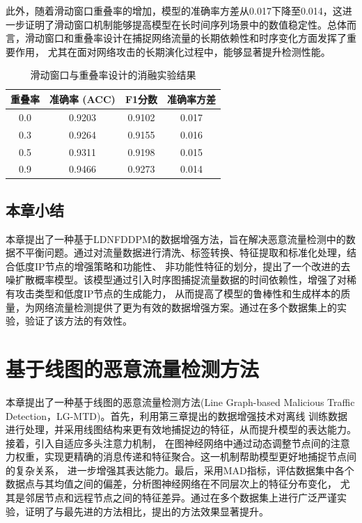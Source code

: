 \documentclass[promaster]{thesis-uestc}
\begin{document}
此外，随着滑动窗口重叠率的增加，模型的准确率方差从0.017下降至0.014，这进一步证明了滑动窗口机制能够提高模型在长时间序列场景中的数值稳定性。总体而言，滑动窗口和重叠率设计在捕捉网络流量的长期依赖性和时序变化方面发挥了重要作用，
尤其在面对网络攻击的长期演化过程中，能够显著提升检测性能。
\begin{table}[h!]
    \centering
    \caption{滑动窗口与重叠率设计的消融实验结果}
    \label{table:ablation_window_overlap}
    \begin{tabular}{c||ccc}
    \hline
    \textbf{重叠率} & \textbf{准确率 (ACC)} & \textbf{F1分数} & \textbf{准确率方差} \\ \hline
    0.0             & 0.9203               & 0.9102          & 0.017             \\ \hline
    0.3             & 0.9264               & 0.9155          & 0.016             \\ \hline
    0.5             & 0.9311               & 0.9198          & 0.015             \\ \hline
    0.9             & 0.9466               & 0.9273          & 0.014             \\ \hline
    \end{tabular}
\end{table}

\section{本章小结}
本章提出了一种基于LDNFDDPM的数据增强方法，旨在解决恶意流量检测中的数据不平衡问题。通过对流量数据进行清洗、标签转换、特征提取和标准化处理，结合低度IP节点的增强策略和功能性、
非功能性特征的划分，提出了一个改进的去噪扩散概率模型。该模型通过引入时序图捕捉流量数据的时间依赖性，增强了对稀有攻击类型和低度IP节点的生成能力，
从而提高了模型的鲁棒性和生成样本的质量，为网络流量检测提供了更为有效的数据增强方案。通过在多个数据集上的实验，验证了该方法的有效性。

\chapter{基于线图的恶意流量检测方法 }
本章提出了一种基于线图的恶意流量检测方法(Line Graph-based Malicious Traffic Detection，LG-MTD)。首先，利用第三章提出的数据增强技术对离线
训练数据进行处理，并采用线图结构来更有效地捕捉边的特征，从而提升模型的表达能力。接着，引入自适应多头注意力机制，
在图神经网络中通过动态调整节点间的注意力权重，实现更精确的消息传递和特征聚合。这一机制帮助模型更好地捕捉节点间的复杂关系，
进一步增强其表达能力。最后，采用MAD指标，评估数据集中各个数据点与其均值之间的偏差，分析图神经网络在不同层次上的特征分布变化，
尤其是邻居节点和远程节点之间的特征差异。通过在多个数据集上进行广泛严谨实验，证明了与最先进的方法相比，提出的方法效果显著提升。
\end{document}
